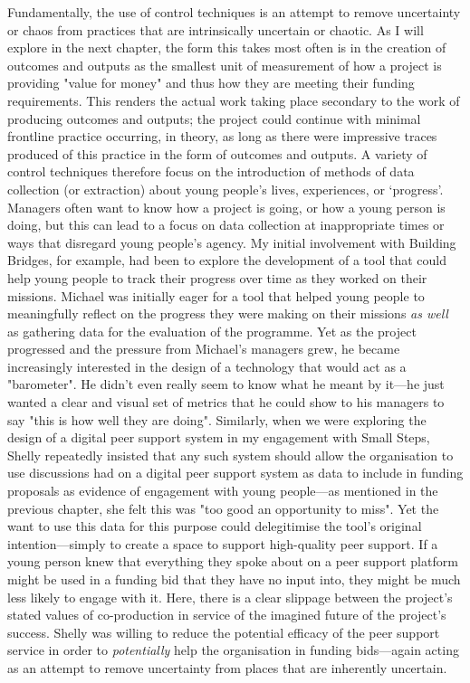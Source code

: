 Fundamentally, the use of control techniques is an attempt to remove uncertainty or chaos from practices that are intrinsically uncertain or chaotic. As I will explore in the next chapter, the form this takes most often is in the creation of outcomes and outputs as the smallest unit of measurement of how a project is providing "value for money" and thus how they are meeting their funding requirements. This renders the actual work taking place secondary to the work of producing outcomes and outputs; the project could continue with minimal frontline practice occurring, in theory, as long as there were impressive traces produced of this practice in the form of outcomes and outputs. A variety of control techniques therefore focus on the introduction of methods of data collection (or extraction) about young people’s lives, experiences, or `progress'. Managers often want to know how a project is going, or how a young person is doing, but this can lead to a focus on data collection at inappropriate times or ways that disregard young people’s agency. My initial involvement with Building Bridges, for example, had been to explore the development of a tool that could help young people to track their progress over time as they worked on their missions. Michael was initially eager for a tool that helped young people to meaningfully reflect on the progress they were making on their missions \emph{as well} as gathering data for the evaluation of the programme. Yet as the project progressed and the pressure from Michael’s managers grew, he became increasingly interested in the design of a technology that would act as a "barometer". He didn’t even really seem to know what he meant by it—he just wanted a clear and visual set of metrics that he could show to his managers to say "this is how well they are doing". Similarly, when we were exploring the design of a digital peer support system in my engagement with Small Steps, Shelly repeatedly insisted that any such system should allow the organisation to use discussions had on a digital peer support system as data to include in funding proposals as evidence of engagement with young people—as mentioned in the previous chapter, she felt this was "too good an opportunity to miss". Yet the want to use this data for this purpose could delegitimise the tool's original intention—simply to create a space to support high-quality peer support. If a young person knew that everything they spoke about on a peer support platform might be used in a funding bid that they have no input into, they might be much less likely to engage with it. Here, there is a clear slippage between the project's stated values of co-production in service of the imagined future of the project's success. Shelly was willing to reduce the potential efficacy of the peer support service in order to \emph{potentially} help the organisation in funding bids—again acting as an attempt to remove uncertainty from places that are inherently uncertain.

